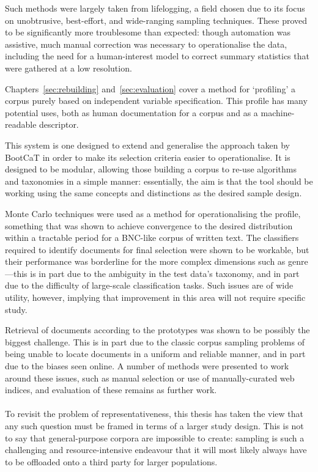 Such methods were largely taken from lifelogging, a field chosen due to its focus on unobtrusive, best-effort, and wide-ranging sampling techniques.  These proved to be significantly more troublesome than expected: though automation was assistive, much manual correction was necessary to operationalise the data, including the need for a human-interest model to correct summary statistics that were gathered at a low resolution.

Chapters~\ref{sec:rebuilding} and~\ref{sec:evaluation} cover a method for `profiling' a corpus purely based on independent variable specification.  This profile has many potential uses, both as human documentation for a corpus and as a machine-readable descriptor.

This system is one designed to extend and generalise the approach taken by BootCaT in order to make its selection criteria easier to operationalise.  It is designed to be modular, allowing those building a corpus to re-use algorithms and taxonomies in a simple manner: essentially, the aim is that the tool should be working using the same concepts and distinctions as the desired sample design.

Monte Carlo techniques were used as a method for operationalising the profile, something that was shown to achieve convergence to the desired distribution within a tractable period for a BNC-like corpus of written text.  The classifiers required to identify documents for final selection were shown to be workable, but their performance was borderline for the more complex dimensions such as genre---this is in part due to the ambiguity in the test data's taxonomy, and in part due to the difficulty of large-scale classification tasks.  Such issues are of wide utility, however, implying that improvement in this area will not require specific study.

Retrieval of documents according to the prototypes was shown to be possibly the biggest challenge.  This is in part due to the classic corpus sampling problems of being unable to locate documents in a uniform and reliable manner, and in part due to the biases seen online.  A number of methods were presented to work around these issues, such as manual selection or use of manually-curated web indices, and evaluation of these remains as further work.




\paragraph{}
To revisit the problem of representativeness, this thesis has taken the view that any such question must be framed in terms of a larger study design.  This is not to say that general-purpose corpora are impossible to create: sampling is such a challenging and resource-intensive endeavour that it will most likely always have to be offloaded onto a third party for larger populations.

